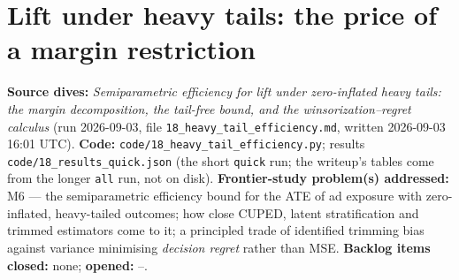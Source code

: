 \chapter{Lift under heavy tails: the price of a margin restriction}
\label{ch:heavytail}

\begin{provenance}
\textbf{Source dives:}  \emph{Semiparametric efficiency for lift under zero-inflated heavy tails: the margin decomposition, the tail-free bound, and the winsorization--regret calculus} (run 2026-09-03, file \texttt{18\_heavy\_tail\_efficiency.md}, written 2026-09-03 16:01 UTC).
\textbf{Code:} \texttt{code/18\_heavy\_tail\_efficiency.py}; results \texttt{code/18\_results\_quick.json} (the short \texttt{quick} run; the writeup's tables come from the longer \texttt{all} run, not on disk).
\textbf{Frontier-study problem(s) addressed:} M6 --- the semiparametric efficiency bound for the ATE of ad exposure with zero-inflated, heavy-tailed outcomes; how close CUPED, latent stratification and trimmed estimators come to it; a principled trade of identified trimming bias against variance minimising \emph{decision regret} rather than MSE.
\textbf{Backlog items closed:} none; \textbf{opened:} --.
\end{provenance}

